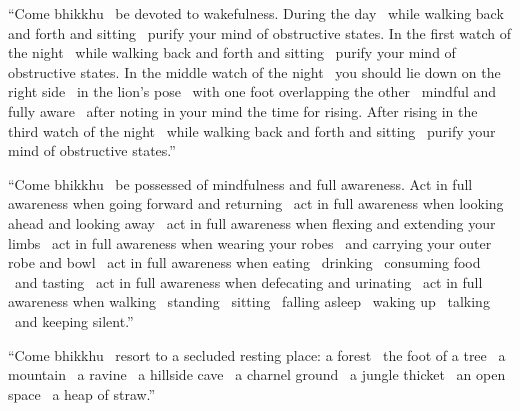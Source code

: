 \begin{justify}
  “Come bhikkhu \breathmark\ be devoted to wakefulness. During the day \breathmark\ while walking back and forth and sitting \breathmark\ purify your mind of obstructive states. In the first watch of the night \breathmark\ while walking back and forth and sitting \breathmark\ purify your mind of obstructive states. In the middle watch of the night \breathmark\ you should lie down on the right side \breathmark\ in the lion’s pose \breathmark\ with one foot overlapping the other \breathmark\ mindful and fully aware \breathmark\ after noting in your mind the time for rising. After rising in the third watch of the night \breathmark\ while walking back and forth and sitting \breathmark\ purify your mind of obstructive states.”
\end{justify}

\begin{justify}
  “Come bhikkhu \breathmark\ be possessed of mindfulness and full awareness. Act in full awareness when going forward and returning \breathmark\ act in full awareness when looking ahead and looking away \breathmark\ act in full awareness when flexing and extending your limbs \breathmark\ act in full awareness when wearing your robes \breathmark\ and carrying your outer robe and bowl \breathmark\ act in full awareness when eating \breathmark\ drinking \breathmark\ consuming food \breathmark\ and tasting \breathmark\ act in full awareness when defecating and urinating \breathmark\ act in full awareness when walking \breathmark\ standing \breathmark\ sitting \breathmark\ falling asleep \breathmark\ waking up
  \breathmark\ talking \breathmark\ and keeping silent.”
\end{justify}

\begin{justify}
  “Come bhikkhu \breathmark\ resort to a secluded resting place: a forest \breathmark\ the foot of a tree \breathmark\ a mountain \breathmark\ a ravine \breathmark\ a hillside cave \breathmark\ a charnel ground \breathmark\ a jungle thicket \breathmark\ an open space \breathmark\ a heap of straw.”
\end{justify}

